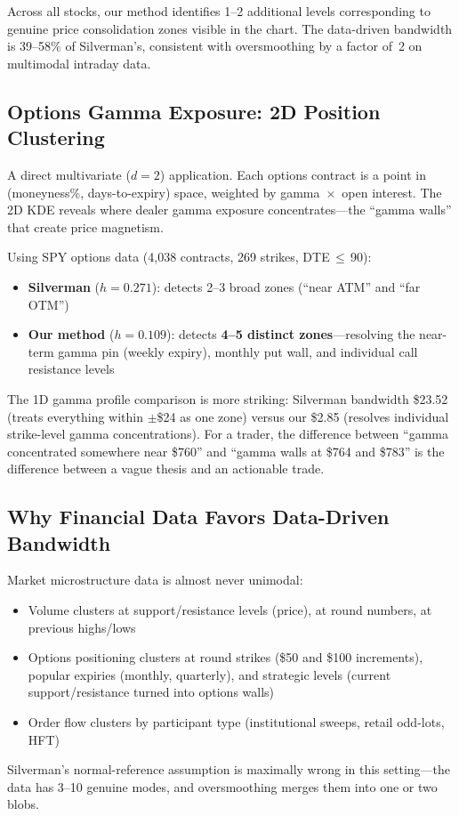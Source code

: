 \documentclass[12pt]{article}
\begin{document}
Across all stocks, our method identifies 1--2 additional levels corresponding to genuine price consolidation zones visible in the chart. The data-driven bandwidth is 39--58\% of Silverman's, consistent with oversmoothing by a factor of~2 on multimodal intraday data.

\subsection{Options Gamma Exposure: 2D Position Clustering}

A direct multivariate ($d{=}2$) application. Each options contract is a point in (moneyness\%, days-to-expiry) space, weighted by gamma~$\times$~open interest. The 2D KDE reveals where dealer gamma exposure concentrates---the ``gamma walls'' that create price magnetism.

Using SPY options data (4,038 contracts, 269 strikes, DTE$\,{\leq}\,$90):
\begin{itemize}
  \item \textbf{Silverman} ($h = 0.271$): detects 2--3 broad zones (``near ATM'' and ``far OTM'')
  \item \textbf{Our method} ($h = 0.109$): detects \textbf{4--5 distinct zones}---resolving the near-term gamma pin (weekly expiry), monthly put wall, and individual call resistance levels
\end{itemize}

The 1D gamma profile comparison is more striking: Silverman bandwidth \$23.52 (treats everything within $\pm$\$24 as one zone) versus our \$2.85 (resolves individual strike-level gamma concentrations). For a trader, the difference between ``gamma concentrated somewhere near \$760'' and ``gamma walls at \$764 and \$783'' is the difference between a vague thesis and an actionable trade.

\subsection{Why Financial Data Favors Data-Driven Bandwidth}

Market microstructure data is almost never unimodal:
\begin{itemize}
  \item Volume clusters at support/resistance levels (price), at round numbers, at previous highs/lows
  \item Options positioning clusters at round strikes (\$50 and \$100 increments), popular expiries (monthly, quarterly), and strategic levels (current support/resistance turned into options walls)
  \item Order flow clusters by participant type (institutional sweeps, retail odd-lots, HFT)
\end{itemize}
Silverman's normal-reference assumption is maximally wrong in this setting---the data has 3--10 genuine modes, and oversmoothing merges them into one or two blobs.
\end{document}
